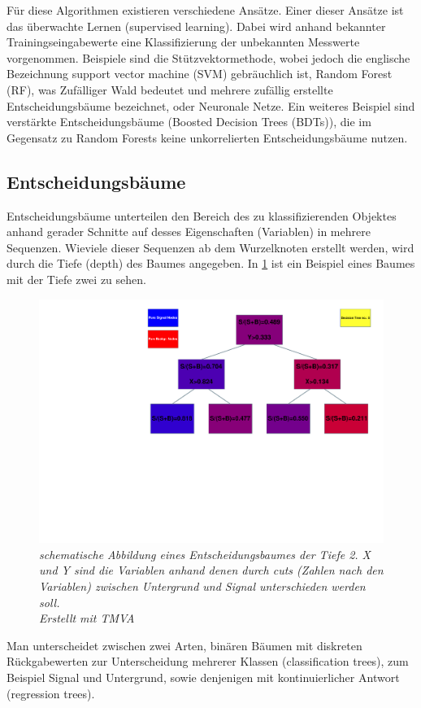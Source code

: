 F\"ur diese Algorithmen existieren verschiedene Ans\"atze. Einer dieser Ans\"atze ist das \"uberwachte Lernen (supervised learning). Dabei wird anhand bekannter Trainingseingabewerte eine Klassifizierung der unbekannten Messwerte vorgenommen. Beispiele sind die St\"utzvektormethode, wobei jedoch die englische Bezeichnung support vector machine (SVM) gebr\"auchlich ist, Random Forest (RF), was Zuf\"alliger Wald bedeutet und mehrere zuf\"allig erstellte Entscheidungsb\"aume bezeichnet, oder Neuronale Netze. Ein weiteres Beispiel sind verst\"arkte Entscheidungsb\"aume (Boosted Decision Trees (BDTs)), die im Gegensatz zu Random Forests keine unkorrelierten Entscheidungsb\"aume nutzen.


\subsection{Entscheidungsb\"aume}
\label{ch:Algorithmen:subsec:Entscheidungsbaum}

Entscheidungsb\"aume unterteilen den Bereich des zu klassifizierenden Objektes anhand gerader Schnitte auf desses Eigenschaften (Variablen) in mehrere Sequenzen. Wieviele dieser Sequenzen ab dem Wurzelknoten erstellt werden, wird durch die Tiefe (depth) des Baumes angegeben. In \ref{fig:DecicionTree} ist ein Beispiel eines Baumes mit der Tiefe zwei zu sehen.\\
\begin{figure}[hhh]
 \begin{center}
   \includegraphics[width=\textwidth]{graphics/tree.pdf}
   \parbox[b]{12cm}{
     \caption[Entscheidungsbaumes der Tiefe 2]
             {\label{fig:DecicionTree} \it schematische Abbildung eines Entscheidungsbaumes der Tiefe 2. X und Y sind die Variablen anhand denen durch cuts (Zahlen nach den Variablen) zwischen Untergrund und Signal unterschieden werden soll.\\Erstellt mit TMVA}
   }
 \end{center}
\end{figure}
Man unterscheidet zwischen zwei Arten, bin\"aren B\"aumen mit diskreten R\"uckgabewerten zur Unterscheidung mehrerer Klassen (classification trees), zum Beispiel Signal und Untergrund, sowie denjenigen mit kontinuierlicher Antwort (regression trees).\cite{SWB-455193959}

